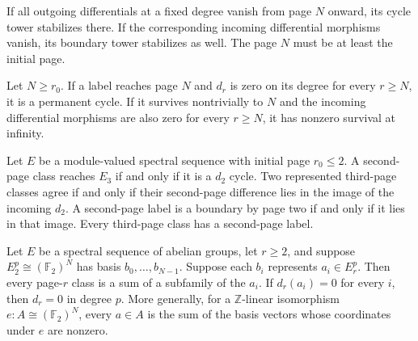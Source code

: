 \begin{theorem}
\label{sem:SpectralSequence:stabilization}
If all outgoing differentials at a fixed degree vanish from page $N$ onward, its cycle tower stabilizes there. If the corresponding incoming differential morphisms vanish, its boundary tower stabilizes as well. The page $N$ must be at least the initial page.
\end{theorem}

\begin{theorem}
\label{sem:SpectralSequence:permanence-from-finite}
Let $N\geq r_0$. If a label reaches page $N$ and $d_r$ is zero on its degree for every $r\geq N$, it is a permanent cycle. If it survives nontrivially to $N$ and the incoming differential morphisms are also zero for every $r\geq N$, it has nonzero survival at infinity.
\end{theorem}

\begin{theorem}
\label{sem:SpectralSequence:page-three}
Let $E$ be a module-valued spectral sequence with initial page $r_0\leq2$. A second-page class reaches $E_3$ if and only if it is a $d_2$ cycle. Two represented third-page classes agree if and only if their second-page difference lies in the image of the incoming $d_2$. A second-page label is a boundary by page two if and only if it lies in that image. Every third-page class has a second-page label.
\end{theorem}

\begin{theorem}
\label{sem:SpectralSequence:representative-expansion}
Let $E$ be a spectral sequence of abelian groups, let $r\geq2$, and suppose $E_2^p\cong(\mathbb F_2)^N$ has basis $b_0,\ldots,b_{N-1}$. Suppose each $b_i$ represents $a_i\in E_r^p$. Then every page-$r$ class is a sum of a subfamily of the $a_i$. If $d_r(a_i)=0$ for every $i$, then $d_r=0$ in degree $p$. More generally, for a $\mathbb Z$-linear isomorphism $e:A\cong(\mathbb F_2)^N$, every $a\in A$ is the sum of the basis vectors whose coordinates under $e$ are nonzero.
\end{theorem}

